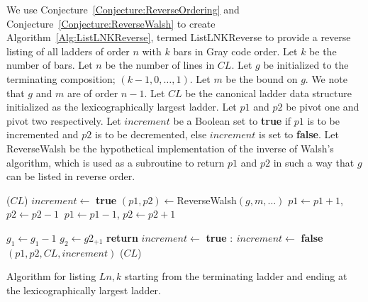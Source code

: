 We use Conjecture~\ref{Conjecture:ReverseOrdering} and Conjecture~\ref{Conjecture:ReverseWalsh} to create Algorithm~\ref{Alg:ListLNKReverse}, 
termed {\sc ListLNKReverse} to provide a reverse listing of all ladders of order $n$ with $k$ bars in Gray code order. 
Let $k$ be the number of bars. Let $n$ be the number of lines in $CL$. 
Let $g$ be initialized to the terminating composition; $(k-1,0, \dots, 1)$. Let $m$ be the bound on $g$. 
We note that $g$ and $m$ are of order $n-1$.
Let $CL$ be the canonical ladder data structure initialized as the lexicographically largest ladder. 
Let $p1$ and $p2$ be pivot one and pivot two respectively. 
Let $increment$ be a Boolean set to \textbf{true} if $p1$ is to be incremented and $p2$ is to be decremented, 
else $increment$ is set to \textbf{false}. Let {\sc ReverseWalsh} be the hypothetical implementation of the inverse 
of Walsh's algorithm, which is used as a subroutine to 
return $p1$ and $p2$ in such a way that $g$ can be listed in reverse order. 

\begin{algorithm}
  \begin{algorithmic}[1]
      ($CL$)
      \State $increment \gets$ \textbf{true}
        \State $(p1,p2) \gets ${\sc ReverseWalsh}$(g,m, \dots)$
         $p1 \gets p1+1$, $p2 \gets p2-1$
        \Else $\: p1 \gets p1-1$, $p2 \gets p2+1$
        \EndIf

          \State $g_{1} \gets g_{1}-1$
          \State $g_{2} \gets g2_{+1}$
          \State \textbf{return}
        \EndIf
         $increment \gets $ \textbf{true} 
        \Else $:\ increment \gets $ \textbf{false}
        \EndIf
        $(p1, p2, CL, increment)$
        ($CL$)
      \EndWhile
    \EndFunction
  \end{algorithmic}
  \caption{Algorithm for listing $L{n,k}$ starting from the terminating ladder and ending at the lexicographically largest ladder.}
  \label{Alg:ListLNKReverse}
\end{algorithm} 

